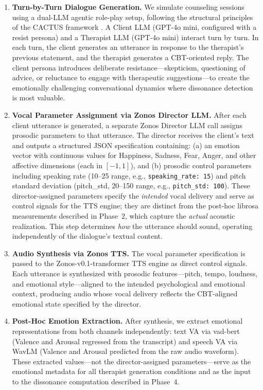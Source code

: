\begin{enumerate}
    \item \textbf{Turn-by-Turn Dialogue Generation.}
    We simulate counseling sessions using a dual-LLM agentic role-play setup, following the structural principles of the CACTUS framework \cite{lee2024cactus}. A Client LLM (GPT-4o mini, configured with a resist persona) and a Therapist LLM (GPT-4o mini) interact turn by turn. In each turn, the client generates an utterance in response to the therapist's previous statement, and the therapist generates a CBT-oriented reply. The client persona introduces deliberate resistance---skepticism, questioning of advice, or reluctance to engage with therapeutic suggestions---to create the emotionally challenging conversational dynamics where dissonance detection is most valuable.

    \item \textbf{Vocal Parameter Assignment via Zonos Director LLM.}
    After each client utterance is generated, a separate Zonos Director LLM call assigns prosodic parameters to that utterance. The director receives the client's text and outputs a structured JSON specification containing: (a) an emotion vector with continuous values for Happiness, Sadness, Fear, Anger, and other affective dimensions (each in $[-1, 1]$), and (b) prosodic control parameters including speaking rate (10--25 range, e.g., \texttt{speaking\_rate: 15}) and pitch standard deviation (pitch\_std, 20--150 range, e.g., \texttt{pitch\_std: 100}). These director-assigned parameters specify the \emph{intended} vocal delivery and serve as control signals for the TTS engine; they are distinct from the post-hoc librosa measurements described in Phase~2, which capture the \emph{actual} acoustic realization. This step determines \emph{how} the utterance should sound, operating independently of the dialogue's textual content.

    \item \textbf{Audio Synthesis via Zonos TTS.}
    The vocal parameter specification is passed to the Zonos-v0.1-transformer TTS engine as direct control signals. Each utterance is synthesized with prosodic features---pitch, tempo, loudness, and emotional style---aligned to the intended psychological and emotional context, producing audio whose vocal delivery reflects the CBT-aligned emotional state specified by the director.

    \item \textbf{Post-Hoc Emotion Extraction.}
    After synthesis, we extract emotional representations from both channels independently: text VA via vad-bert (Valence and Arousal regressed from the transcript) and speech VA via WavLM (Valence and Arousal predicted from the raw audio waveform). These extracted values---not the director-assigned parameters---serve as the emotional metadata for all therapist generation conditions and as the input to the dissonance computation described in Phase~4.
\end{enumerate}

